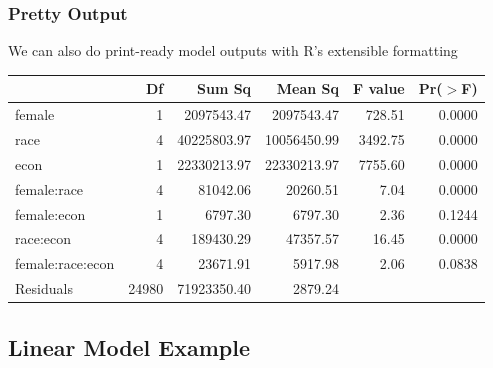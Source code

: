 \documentclass[12pt,handout]{beamer}
\begin{document}
\begin{frame}
\frametitle{Pretty Output}
We can also do print-ready model outputs with R's extensible formatting
\begin{table}[ht]
\begin{center}
\begin{tabular}{lrrrrr}
  \hline
 & Df & Sum Sq & Mean Sq & F value & Pr($>$F) \\ 
  \hline
female           & 1 & 2097543.47 & 2097543.47 & 728.51 & 0.0000 \\ 
  race             & 4 & 40225803.97 & 10056450.99 & 3492.75 & 0.0000 \\ 
  econ             & 1 & 22330213.97 & 22330213.97 & 7755.60 & 0.0000 \\ 
  female:race      & 4 & 81042.06 & 20260.51 & 7.04 & 0.0000 \\ 
  female:econ      & 1 & 6797.30 & 6797.30 & 2.36 & 0.1244 \\ 
  race:econ        & 4 & 189430.29 & 47357.57 & 16.45 & 0.0000 \\ 
  female:race:econ & 4 & 23671.91 & 5917.98 & 2.06 & 0.0838 \\ 
  Residuals        & 24980 & 71923350.40 & 2879.24 &  &  \\ 
   \hline
\end{tabular}
\end{center}
\end{table}\end{frame}

\subsection{Linear Model Example}
\end{document}

